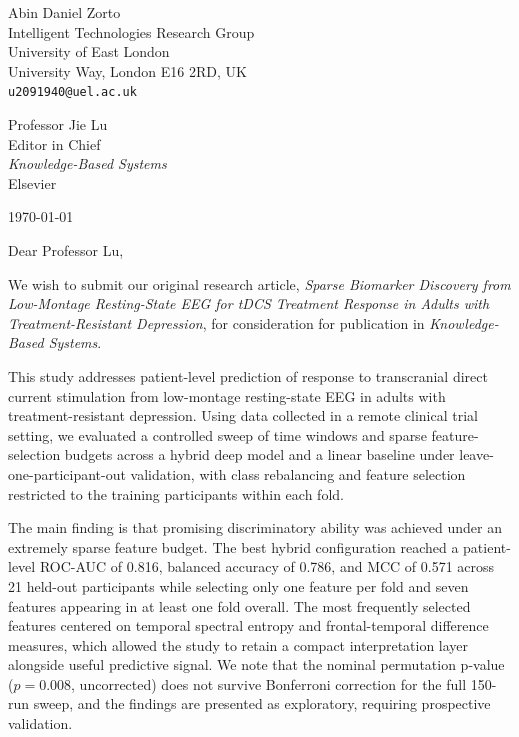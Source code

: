 \documentclass[11pt]{article}
\begin{document}
\begin{flushleft}
Abin Daniel Zorto\\
Intelligent Technologies Research Group\\
University of East London\\
University Way, London E16 2RD, UK\\
\texttt{u2091940@uel.ac.uk}
\end{flushleft}

\vspace{0.8em}

\begin{flushleft}
Professor Jie Lu\\
Editor in Chief\\
\emph{Knowledge-Based Systems}\\
Elsevier
\end{flushleft}

\vspace{0.8em}

\begin{flushleft}
\today
\end{flushleft}

\vspace{0.8em}

Dear Professor Lu,

We wish to submit our original research article, \emph{Sparse Biomarker Discovery from Low-Montage Resting-State EEG for tDCS Treatment Response in Adults with Treatment-Resistant Depression}, for consideration for publication in \emph{Knowledge-Based Systems}.

This study addresses patient-level prediction of response to transcranial direct current stimulation from low-montage resting-state EEG in adults with treatment-resistant depression. Using data collected in a remote clinical trial setting, we evaluated a controlled sweep of time windows and sparse feature-selection budgets across a hybrid deep model and a linear baseline under leave-one-participant-out validation, with class rebalancing and feature selection restricted to the training participants within each fold.

The main finding is that promising discriminatory ability was achieved under an extremely sparse feature budget. The best hybrid configuration reached a patient-level ROC-AUC of 0.816, balanced accuracy of 0.786, and MCC of 0.571 across 21 held-out participants while selecting only one feature per fold and seven features appearing in at least one fold overall. The most frequently selected features centered on temporal spectral entropy and frontal-temporal difference measures, which allowed the study to retain a compact interpretation layer alongside useful predictive signal. We note that the nominal permutation p-value ($p=0.008$, uncorrected) does not survive Bonferroni correction for the full 150-run sweep, and the findings are presented as exploratory, requiring prospective validation.
\end{document}
